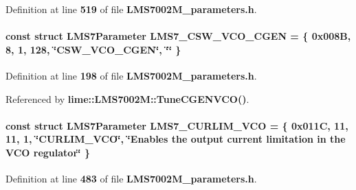 Definition at line {\bf 519} of file {\bf L\+M\+S7002\+M\+\_\+parameters.\+h}.

\paragraph[{L\+M\+S7\+\_\+\+C\+S\+W\+\_\+\+V\+C\+O\+\_\+\+C\+G\+EN}]{\setlength{\rightskip}{0pt plus 5cm}const struct {\bf L\+M\+S7\+Parameter} L\+M\+S7\+\_\+\+C\+S\+W\+\_\+\+V\+C\+O\+\_\+\+C\+G\+EN = \{ 0x008\+B, 8, 1, 128, \char`\"{}\+C\+S\+W\+\_\+\+V\+C\+O\+\_\+\+C\+G\+E\+N\char`\"{}, \char`\"{}\char`\"{} \}\hspace{0.3cm}{\ttfamily [static]}}\label{LMS7002M__parameters_8h_a2a8d2d037a298c1744f7eb0d10384c11}


Definition at line {\bf 198} of file {\bf L\+M\+S7002\+M\+\_\+parameters.\+h}.



Referenced by {\bf lime\+::\+L\+M\+S7002\+M\+::\+Tune\+C\+G\+E\+N\+V\+C\+O()}.

\paragraph[{L\+M\+S7\+\_\+\+C\+U\+R\+L\+I\+M\+\_\+\+V\+CO}]{\setlength{\rightskip}{0pt plus 5cm}const struct {\bf L\+M\+S7\+Parameter} L\+M\+S7\+\_\+\+C\+U\+R\+L\+I\+M\+\_\+\+V\+CO = \{ 0x011\+C, 11, 11, 1, \char`\"{}\+C\+U\+R\+L\+I\+M\+\_\+\+V\+C\+O\char`\"{}, \char`\"{}\+Enables the output current limitation in the V\+C\+O regulator\char`\"{} \}\hspace{0.3cm}{\ttfamily [static]}}\label{LMS7002M__parameters_8h_ab33a9c9a6cee3515daf01c87bc4bf486}


Definition at line {\bf 483} of file {\bf L\+M\+S7002\+M\+\_\+parameters.\+h}.

